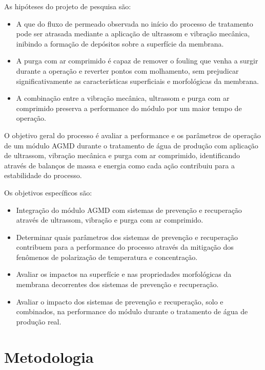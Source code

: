 \documentclass[a4paper,12pt]{article}
\begin{document}
As hipóteses do projeto de pesquisa são: 

\begin{itemize}
\item A que do fluxo de permeado observada no início do processo de tratamento pode ser atrasada mediante a aplicação de ultrassom e vibração mecânica, inibindo a formação de depósitos sobre a superfície da membrana. 

\item A purga com ar comprimido é capaz de remover o fouling que venha a surgir durante a operação e reverter pontos com molhamento, sem prejudicar significativamente as características superficiais e morfológicas da membrana. 

\item A combinação entre a vibração mecânica, ultrassom e purga com ar comprimido preserva a performance do módulo por um maior tempo de operação. 
\end{itemize}

O objetivo geral do processo é avaliar a performance e os parâmetros de operação de um módulo AGMD durante o tratamento de água de produção com aplicação de ultrassom, vibração mecânica e purga com ar comprimido, identificando através de balanços de massa e energia como cada ação contribuiu para a estabilidade do processo. 

Os objetivos específicos são: 

\begin{itemize}

\item Integração do módulo AGMD com sistemas de prevenção e recuperação através de ultrassom, vibração e purga com ar comprimido. 

\item Determinar quais parâmetros dos sistemas de prevenção e recuperação contribuem para a performance do processo através da mitigação dos fenômenos de polarização de temperatura e concentração. 

\item Avaliar os impactos na superfície e nas propriedades morfológicas da membrana decorrentes dos sistemas de prevenção e recuperação. 

\item Avaliar o impacto dos sistemas de prevenção e recuperação, solo e combinados, na performance do módulo durante o tratamento de água de produção real. 
\end{itemize}

\section{Metodologia}
\end{document}
